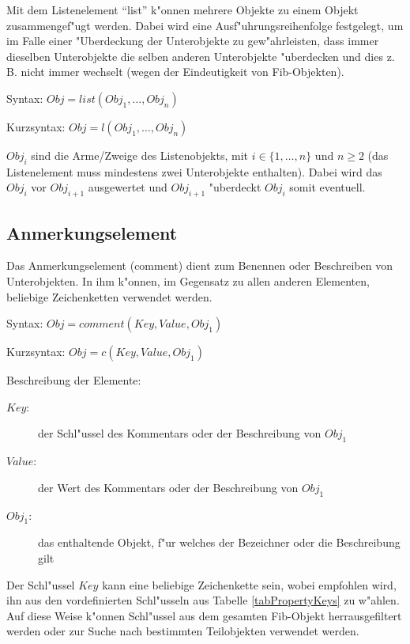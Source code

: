 Mit dem Listenelement ``list'' k"onnen mehrere Objekte zu einem Objekt zusammengef"ugt werden. Dabei wird eine Ausf"uhrungsreihenfolge festgelegt, um im Falle einer "Uberdeckung der Unterobjekte zu gew"ahrleisten, dass immer dieselben Unterobjekte die selben anderen Unterobjekte "uberdecken und dies z. B. nicht immer wechselt (wegen der Eindeutigkeit von Fib-Objekten).

\bigskip\noindent
Syntax:
$Obj = list( Obj_1, \ldots, Obj_n)$

\bigskip\noindent
Kurzsyntax:
$Obj = l( Obj_1, \ldots, Obj_n )$

\bigskip\noindent
$Obj_i$ sind die Arme/Zweige des Listenobjekts, mit $i \in\{1, \ldots ,n\}$ und $n \geq 2$ (das Listenelement muss mindestens zwei Unterobjekte enthalten). Dabei wird das $Obj_i$ vor $Obj_{i+1}$ ausgewertet und $Obj_{i+1}$ "uberdeckt $Obj_{i}$ somit eventuell.



\subsection{Anmerkungselement}
\label{fibComment}\label{secFibComment}

Das Anmerkungselement (comment) dient zum Benennen oder Beschreiben von Unterobjekten. In ihm k"onnen, im Gegensatz zu allen anderen Elementen, beliebige Zeichenketten verwendet werden.


\bigskip\noindent
Syntax:
$Obj = comment( Key , Value , Obj_1)$

\bigskip\noindent
Kurzsyntax:
$Obj = c( Key , Value , Obj_1)$

\bigskip\noindent
Beschreibung der Elemente:
\begin{description}
 \item[$Key$:] der Schl"ussel des Kommentars oder der Beschreibung von $Obj_1$
 \item[$Value$:] der Wert des Kommentars oder der Beschreibung von $Obj_1$
 \item[$Obj_1$:] das enthaltende  Objekt, f"ur welches der Bezeichner oder die Beschreibung gilt
\end{description}

Der Schl"ussel $Key$ kann eine beliebige Zeichenkette sein, wobei empfohlen wird, ihn aus den vordefinierten Schl"usseln aus Tabelle \ref{tabPropertyKeys} zu w"ahlen.
Auf diese Weise k"onnen Schl"ussel aus dem gesamten Fib-Objekt herrausgefiltert werden oder zur Suche nach bestimmten Teilobjekten verwendet werden.

